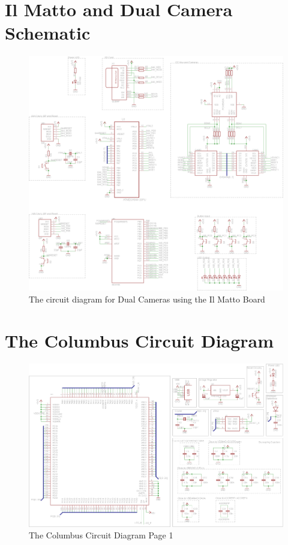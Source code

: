\section{Il Matto and Dual Camera Schematic}
\begin{figure}[ht!]
\centering
\includegraphics[angle = 90, width=\textwidth,height=\textheight,keepaspectratio]{Figures/IlMattoCamera_CircuitDiagram.png} 
\caption{The circuit diagram for Dual Cameras using the Il Matto Board}
\label{sch:DualCam_Schematic}

\end{figure}

\section{The Columbus Circuit Diagram} \label{sch:Columbus:CircuitDiagram}
\begin{figure}[ht!]
\centering
\includegraphics[angle = 90, width=\textwidth,height=\textheight,keepaspectratio]{./Figures/ColumbusCircuitPage1.png}
\caption{The Columbus Circuit Diagram Page 1}
\label{sch:Columbus_Schematic:1}
\end{figure}

